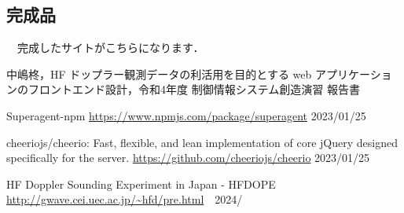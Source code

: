 \subsection{完成品}
　完成したサイトがこちらになります．
\small
\begin{thebibliography}{99}
\setlength{\itemsep}{0pt}
\smallskip

中嶋柊，HF ドップラー観測データの利活用を目的とする web アプリケーションのフロントエンド設計，令和4年度 制御情報システム創造演習 報告書

Superagent-npm 
\url{https://www.npmjs.com/package/superagent}  2023/01/25

cheeriojs/cheerio: Fast, flexible, and lean implementation of core jQuery designed specifically for the server. 
\url{https://github.com/cheeriojs/cheerio}  2023/01/25 

HF Doppler Sounding Experiment in Japan - HFDOPE
\url{http://gwave.cei.uec.ac.jp/~hfd/pre.html}　2024/

\end{thebibliography}
\normalsize





